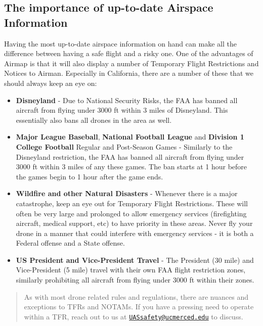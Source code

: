 \documentclass[
]{book}
\providecommand{\tightlist}{%
  \setlength{\itemsep}{0pt}\setlength{\parskip}{0pt}}
\begin{document}
\hypertarget{the-importance-of-up-to-date-airspace-information}{%
\subsection{The importance of up-to-date Airspace Information}\label{the-importance-of-up-to-date-airspace-information}}

Having the most up-to-date airspace information on hand can make all the difference between having a safe flight and a risky one. One of the advantages of Airmap is that it will also display a number of Temporary Flight Restrictions and Notices to Airman. Especially in California, there are a number of these that we should always keep an eye on:

\begin{itemize}
\tightlist
\item
  \textbf{Disneyland} - Due to National Security Risks, the FAA has banned all aircraft from flying under 3000 ft within 3 miles of Disneyland. This essentially also bans all drones in the area as well.\\
\item
  \textbf{Major League Baseball}, \textbf{National Football League} and \textbf{Division 1 College Football} Regular and Post-Season Games - Similarly to the Disneyland restriction, the FAA has banned all aircraft from flying under 3000 ft within 3 miles of any these games. The ban starts at 1 hour before the games begin to 1 hour after the game ends.\\
\item
  \textbf{Wildfire and other Natural Disasters} - Whenever there is a major catastrophe, keep an eye out for Temporary Flight Restrictions. These will often be very large and prolonged to allow emergency services (firefighting aircraft, medical support, etc) to have priority in these areas. Never fly your drone in a manner that could interfere with emergency services - it is both a Federal offense and a State offense.\\
\item
  \textbf{US President and Vice-President Travel} - The President (30 mile) and Vice-President (5 mile) travel with their own FAA flight restriction zones, similarly prohibiting all aircraft from flying under 3000 ft within their zones.
\end{itemize}

\begin{quote}
As with most drone related rules and regulations, there are nuances and exceptions to TFRs and NOTAMs. If you have a pressing need to operate within a TFR, reach out to us at \href{mailto:UASsafety@ucmerced.edu}{\nolinkurl{UASsafety@ucmerced.edu}} to discuss.
\end{quote}
\end{document}
